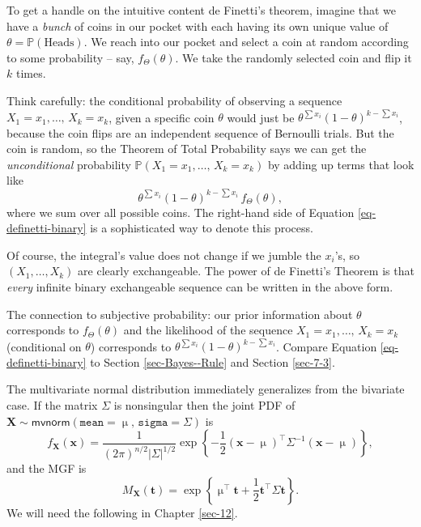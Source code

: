 \documentclass[captions=tableheading]{scrbook}
\begin{document}
To get a handle on the intuitive content de Finetti's theorem, imagine that we have a \emph{bunch} of coins in our pocket with each having its own unique value of \(\theta=\mathbb{P}(\mbox{Heads})\). We reach into our pocket and select a coin at random according to some probability -- say, \(f_{\Theta}(\theta)\). We take the randomly selected coin and flip it \(k\) times. 

Think carefully: the conditional probability of observing a sequence  \(X_{1}=x_{1},\ldots,\, X_{k}=x_{k}\), given a specific coin \(\theta\) would just be \(\theta^{\sum x_{i}}(1-\theta)^{k-\sum x_{i}}\), because the coin flips are an independent sequence of Bernoulli trials. But the coin is random, so the Theorem of Total Probability says we can get the \emph{unconditional} probability \(\mathbb{P}(X_{1}=x_{1},\ldots,\, X_{k}=x_{k})\) by adding up terms that look like
\begin{equation}
\theta^{\sum x_{i}}(1-\theta)^{k-\sum x_{i}}\, f_{\Theta}(\theta),
\end{equation}
where we sum over all possible coins. The right-hand side of Equation \ref{eq-definetti-binary} is a sophisticated way to denote this process.

Of course, the integral's value does not change if we jumble the \(x_{i}\)'s, so \((X_{1},\ldots,X_{k})\) are clearly exchangeable. The power of de Finetti's Theorem is that \emph{every} infinite binary exchangeable sequence can be written in the above form.

The connection to subjective probability: our prior information about \(\theta\) corresponds to \(f_{\Theta}(\theta)\) and the likelihood of the sequence \(X_{1}=x_{1},\ldots,\, X_{k}=x_{k}\) (conditional on \(\theta\)) corresponds to \(\theta^{\sum x_{i}}(1-\theta)^{k-\sum x_{i}}\). Compare Equation \ref{eq-definetti-binary} to Section \ref{sec-Bayes--Rule} and Section \ref{sec-7-3}.

The multivariate normal distribution immediately generalizes from the bivariate case. If the matrix \(\Sigma\) is nonsingular then the joint PDF of \(\mathbf{X}\sim\mathsf{mvnorm}(\mathtt{mean}=\upmu,\,\mathtt{sigma}=\Sigma)\) is
\begin{equation}
f_{\mathbf{X}}(\mathbf{x})=\frac{1}{(2\pi)^{n/2}\left|\Sigma\right|^{1/2}}\exp\left\{ -\frac{1}{2}\left(\mathbf{x}-\upmu\right)^{\top}\Sigma^{-1}\left(\mathbf{x}-\upmu\right)\right\},
\end{equation}
and the MGF is
\begin{equation}
M_{\mathbf{X}}(\mathbf{t})=\exp\left\{ \upmu^{\top}\mathbf{t}+\frac{1}{2}\mathbf{t}^{\top}\Sigma\mathbf{t}\right\}.
\end{equation}
We will need the following in Chapter \ref{sec-12}.
\end{document}
